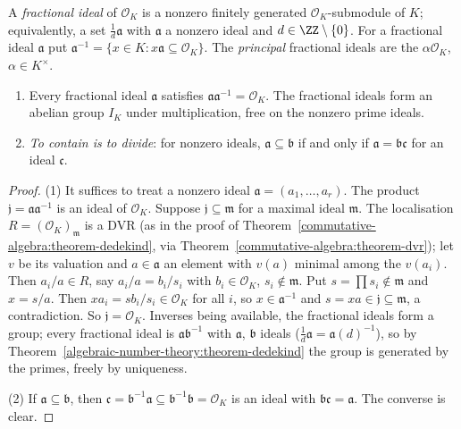 \begin{definition}\label{algebraic-number-theory:definition-fractional-ideal}
A \emph{fractional ideal} of $\mathcal{O}_K$ is a nonzero finitely generated $\mathcal{O}_K$-submodule of $K$; equivalently, a set $\frac1d\mathfrak{a}$ with $\mathfrak{a}$ a nonzero ideal and
$d \in \ZZ \setminus \{0\}$. For a fractional ideal $\mathfrak{a}$ put $\mathfrak{a}^{-1} = \{x \in K : x\mathfrak{a} \subseteq \mathcal{O}_K\}$. The \emph{principal} fractional ideals are the $\alpha\mathcal{O}_K$,
$\alpha \in K^\times$.
\end{definition}

\begin{theorem}\label{algebraic-number-theory:theorem-fractional-ideals}
\begin{enumerate}
\item Every fractional ideal $\mathfrak{a}$ satisfies $\mathfrak{a}\mathfrak{a}^{-1} = \mathcal{O}_K$. The fractional ideals form an abelian group $I_K$ under multiplication, free on the nonzero prime ideals.
\item \emph{To contain is to divide}: for nonzero ideals, $\mathfrak{a} \subseteq \mathfrak{b}$ if and only if $\mathfrak{a} = \mathfrak{b}\mathfrak{c}$ for an ideal $\mathfrak{c}$.
\end{enumerate}
\end{theorem}

\begin{proof}
(1) It suffices to treat a nonzero ideal $\mathfrak{a} = (a_1, \dots, a_r)$. The product $\mathfrak{j} = \mathfrak{a}\mathfrak{a}^{-1}$ is an ideal of $\mathcal{O}_K$. Suppose $\mathfrak{j} \subseteq \mathfrak{m}$ for a
maximal ideal $\mathfrak{m}$. The localisation $R = (\mathcal{O}_K)_\mathfrak{m}$ is a DVR (as in the proof of Theorem~\ref{commutative-algebra:theorem-dedekind}, via
Theorem~\ref{commutative-algebra:theorem-dvr}); let $v$ be its valuation and $a \in \mathfrak{a}$ an element with $v(a)$ minimal among the $v(a_i)$. Then $a_i/a \in R$, say $a_i/a = b_i/s_i$ with
$b_i \in \mathcal{O}_K$, $s_i \notin \mathfrak{m}$. Put $s = \prod s_i \notin \mathfrak{m}$ and $x = s/a$. Then $xa_i = sb_i/s_i \in \mathcal{O}_K$ for all $i$, so $x \in \mathfrak{a}^{-1}$ and
$s = xa \in \mathfrak{j} \subseteq \mathfrak{m}$, a contradiction. So $\mathfrak{j} = \mathcal{O}_K$. Inverses being available, the fractional ideals form a group; every fractional ideal is $\mathfrak{a}\mathfrak{b}^{-1}$
with $\mathfrak{a}$, $\mathfrak{b}$ ideals ($\frac1d\mathfrak{a} = \mathfrak{a}(d)^{-1}$), so by Theorem~\ref{algebraic-number-theory:theorem-dedekind} the group is generated by the primes, freely by uniqueness.

(2) If $\mathfrak{a} \subseteq \mathfrak{b}$, then $\mathfrak{c} = \mathfrak{b}^{-1}\mathfrak{a} \subseteq \mathfrak{b}^{-1}\mathfrak{b} = \mathcal{O}_K$ is an ideal with $\mathfrak{b}\mathfrak{c} = \mathfrak{a}$. The converse is clear.
\end{proof}

